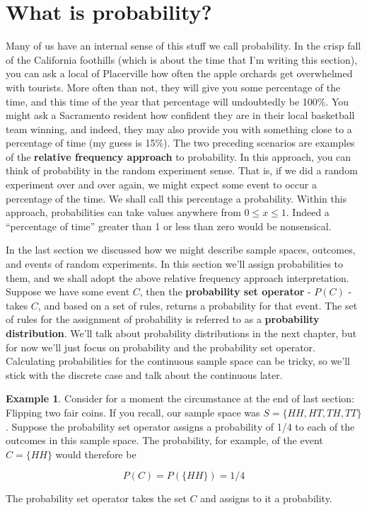 \documentclass[
]{book}
\theoremstyle{definition}
\theoremstyle{definition}
\newtheorem{example}{Example}[chapter]
\theoremstyle{definition}
\theoremstyle{definition}
\theoremstyle{remark}
\begin{document}
\section{What is probability?}\label{what-is-probability}

Many of us have an internal sense of this stuff we call probability. In the crisp fall of the California foothills (which is about the time that I'm writing this section), you can ask a local of Placerville how often the apple orchards get overwhelmed with tourists. More often than not, they will give you some percentage of the time, and this time of the year that percentage will undoubtedly be 100\%. You might ask a Sacramento resident how confident they are in their local basketball team winning, and indeed, they may also provide you with something close to a percentage of time (my guess is 15\%). The two preceding scenarios are examples of the \textbf{relative frequency approach} to probability. In this approach, you can think of probability in the random experiment sense. That is, if we did a random experiment over and over again, we might expect some event to occur a percentage of the time. We shall call this percentage a probability. Within this approach, probabilities can take values anywhere from \(0\leq x\leq1\). Indeed a ``percentage of time'' greater than 1 or less than zero would be nonsensical.

In the last section we discussed how we might describe sample spaces, outcomes, and events of random experiments. In this section we'll assign probabilities to them, and we shall adopt the above relative frequency approach interpretation. Suppose we have some event \(C\), then the \textbf{probability set operator} - \(P(C)\) - takes \(C\), and based on a set of rules, returns a probability for that event. The set of rules for the assignment of probability is referred to as a \textbf{probability distribution}. We'll talk about probability distributions in the next chapter, but for now we'll just focus on probability and the probability set operator. Calculating probabilities for the continuous sample space can be tricky, so we'll stick with the discrete case and talk about the continuous later.

\begin{example}
Consider for a moment the circumstance at the end of last section: Flipping two fair coins. If you recall, our sample space was \(S = \{HH,HT,TH,TT\}\). Suppose the probability set operator assigns a probability of 1/4 to each of the outcomes in this sample space. The probability, for example, of the event \(C = \{HH\}\) would therefore be

\[ P(C) = P(\{HH\}) = 1/4 \]

The probability set operator takes the set \(C\) and assigns to it a probability.
\end{example}
\end{document}
